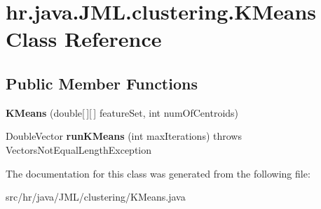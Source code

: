 \hypertarget{classhr_1_1java_1_1_j_m_l_1_1clustering_1_1_k_means}{\section{hr.\+java.\+J\+M\+L.\+clustering.\+K\+Means Class Reference}
\label{classhr_1_1java_1_1_j_m_l_1_1clustering_1_1_k_means}
}
\subsection*{Public Member Functions}
\begin{DoxyCompactItemize}
\item 
\hypertarget{classhr_1_1java_1_1_j_m_l_1_1clustering_1_1_k_means_ab162ea9f1256d87ccdbaace42dd064ce}{{\bfseries K\+Means} (double\mbox{[}$\,$\mbox{]}\mbox{[}$\,$\mbox{]} feature\+Set, int num\+Of\+Centroids)}\label{classhr_1_1java_1_1_j_m_l_1_1clustering_1_1_k_means_ab162ea9f1256d87ccdbaace42dd064ce}

\item 
\hypertarget{classhr_1_1java_1_1_j_m_l_1_1clustering_1_1_k_means_a065485884a0ff44c7273b4c027ede76e}{Double\+Vector {\bfseries run\+K\+Means} (int max\+Iterations)  throws Vectors\+Not\+Equal\+Length\+Exception}\label{classhr_1_1java_1_1_j_m_l_1_1clustering_1_1_k_means_a065485884a0ff44c7273b4c027ede76e}

\end{DoxyCompactItemize}


The documentation for this class was generated from the following file\+:\begin{DoxyCompactItemize}
\item 
src/hr/java/\+J\+M\+L/clustering/K\+Means.\+java\end{DoxyCompactItemize}
